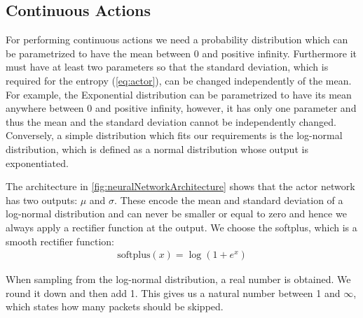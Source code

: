 \documentclass[conference]{IEEEtran}
\newcommand\note[2]{{\color{#1}#2}}
\begin{document}

\subsection{Continuous Actions}

For performing continuous actions we need a probability distribution which can be parametrized to have the mean between 0 and positive infinity. Furthermore it must have at least two parameters so that the standard deviation, which is required for the entropy (\autoref{eq:actor}), can be changed independently of the mean. For example, the Exponential distribution can be parametrized to have its mean anywhere between 0 and positive infinity, however, it has only one parameter and thus the mean and the standard deviation cannot be independently changed. Conversely, a simple distribution which fits our requirements is the log-normal distribution, which is defined as a normal distribution whose output is exponentiated.


The architecture in \autoref{fig:neuralNetworkArchitecture} shows that the actor network has two outputs: $\mu$ and $\sigma$. These encode the mean and standard deviation of a log-normal distribution and can never be smaller or equal to zero and hence we always apply a rectifier function at the output. We choose the softplus, which is a smooth rectifier function:
\begin{align}
\text{softplus}(x) = \log\left(1 + e^x \right)
\end{align}

When sampling from the log-normal distribution, a real number is obtained. We round it down and then add 1. This gives us a natural number between 1 and $\infty$, which states how many packets should be skipped. 
\end{document}
